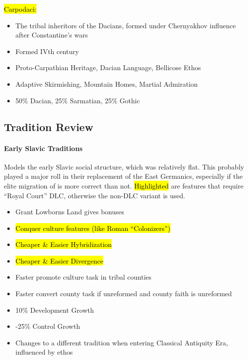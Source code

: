 \documentclass{article}
\begin{document}
	\hl{Carpodaci:}
	\begin{itemize}
		\item The tribal inheritors of the Dacians, formed under Chernyakhov influence after Constantine's wars
		\item Formed IVth century
		\item Proto-Carpathian Heritage, Dacian Language, Bellicose Ethos
		\item Adaptive Skirmishing, Mountain Homes, Martial Admiration
		\item 50\% Dacian, 25\% Sarmatian, 25\% Gothic
	\end{itemize}
	
	\newpage
	
	\subsection{Tradition Review}
	\label{sec:culture_review:subsec:tradition_review}
	
	\paragraph{Early Slavic Traditions}
	Models the early Slavic social structure, which was relatively flat. This probably played a major roll in their replacement of the East Germanics, especially if the elite migration of \cite{HeatherEmpiresAndBarbarians} is more correct than not. \hl{Highlighted} are features that require “Royal Court” DLC, otherwise the non-DLC variant is used.
	
	\begin{itemize}
		\item Grant Lowborns Land gives bonuses
		\item \hl{Conquer culture features (like Roman “Colonizers”)}
		\item \hl{Cheaper \& Easier Hybridization}
		\item \hl{Cheaper \& Easier Divergence}
		\item Faster promote culture task in tribal counties
		\item Faster convert county task if unreformed and county faith is unreformed
		\item 10\% Development Growth
		\item -25\% Control Growth
		\item Changes to a different tradition when entering Classical Antiquity Era, influenced by ethos
	\end{itemize}
	
\end{document}
